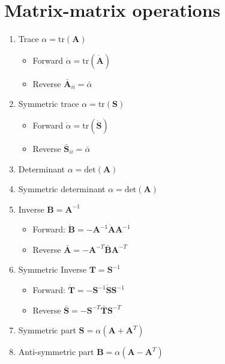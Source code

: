 \documentclass{article}
\begin{document}
\section{Matrix-matrix operations}

\begin{enumerate}
\item Trace $\alpha = \text{tr}(\mathbf{A})$
\begin{itemize}
\item Forward $\dot{\alpha} = \text{tr}(\dot{\mathbf{A}})$
\item Reverse $\bar{\mathbf{A}}_{ii} = \bar{\alpha}$
\end{itemize}

\item Symmetric trace $\alpha = \text{tr}(\mathbf{S})$
\begin{itemize}
\item Forward $\dot{\alpha} = \text{tr}(\dot{\mathbf{S}})$
\item Reverse $\bar{\mathbf{S}}_{ii} = \bar{\alpha}$
\end{itemize}

\item Determinant $\alpha = \text{det}(\mathbf{A})$
\item Symmetric determinant $\alpha = \text{det}(\mathbf{A})$

\item Inverse $\mathbf{B} = \mathbf{A}^{-1}$
\begin{itemize}
\item Forward: $\dot{\mathbf{B}} = - \mathbf{A}^{-1} \dot{\mathbf{A}} \mathbf{A}^{-1}$
\item Reverse $\bar{\mathbf{A}} = - \mathbf{A}^{-T} \bar{\mathbf{B}} \mathbf{A}^{-T}$
\end{itemize}

\item Symmetric Inverse $\mathbf{T} = \mathbf{S}^{-1}$
\begin{itemize}
\item Forward: $\dot{\mathbf{T}} = - \mathbf{S}^{-1} \dot{\mathbf{S}} \mathbf{S}^{-1}$
\item Reverse $\bar{\mathbf{S}} = - \mathbf{S}^{-T} \bar{\mathbf{T}} \mathbf{S}^{-T}$
\end{itemize}

\item Symmetric part $\mathbf{S} = \alpha(\mathbf{A} + \mathbf{A}^{T})$
\item Anti-symmetric part $\mathbf{B} = \alpha (\mathbf{A} - \mathbf{A}^{T})$


\end{enumerate}
\end{document}
